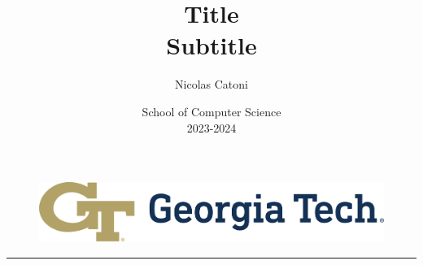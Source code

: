 \documentclass{article}
\begin{document}
\begin{figure}[t]
\centering\includegraphics[height=2cm]{gt.png}
\end{figure}
\vspace{-10cm}
\title{\textbf{Title} \\ Subtitle}
\author{Nicolas Catoni}

\date{
  School of Computer Science \\
  2023-2024
}

\maketitle

\centering\rule{0.6\linewidth}{0.5pt}

\vspace{1cm}
\raggedright
\end{document}
